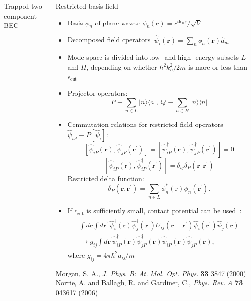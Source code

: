 \documentclass[final,hyperref={pdfpagelabels=false}]{beamer}
\begin{document}
\begin{frame}
\begin{columns}
{\begin{block}{Trapped two-component BEC}
\end{block}

\begin{block}{Restricted basis field}

\begin{itemize}
	\item Basis $\phi_{n}$ of plane waves: $\phi_{n}(\mathbf{r}) = e^{i \mathbf{k}_n \mathbf{r}} / \sqrt{V}$
	\item Decomposed field operators: $\hat{\psi}_i(\mathbf{r}) = \sum\limits_n \phi_{n}(\mathbf{r}) \hat{a}_{in}$
	\item Mode space is divided into low- and high- energy subsets $L$ and $H$,
		depending on whether $\hbar^2 k_n^2 / 2 m $ is more or less than $\epsilon_{\textrm{cut}}$~\cite{norrie}
	\item Projector operators:	
\[ P \equiv \sum\limits_{n \in L} \lvert n \rangle \langle n \rvert,\,
Q \equiv \sum\limits_{n \in H} \lvert n \rangle \langle n \rvert \]
	\item Commutation relations for restricted field operators $\hat{\psi}_{iP} \equiv P[\hat{\psi}_i]$:
\[
\left[ \hat{\psi}_{iP}(\mathbf{r}), \hat{\psi}_{jP}(\mathbf{r}^\prime) \right] =
\left[ \hat{\psi}_{iP}^\dagger(\mathbf{r}), \hat{\psi}_{jP}^\dagger(\mathbf{r}^\prime) \right] = 0
\]
\[
\left[ \hat{\psi}_{iP}(\mathbf{r}), \hat{\psi}_{iP}^\dagger(\mathbf{r}^\prime) \right] = \delta_{ij} \delta_{P}(\mathbf{r}, \mathbf{r}^\prime)
\]
	Restricted delta function:
\[
\delta_{P}(\mathbf{r}, \mathbf{r}^\prime) = \sum\limits_{n \in L} \phi_{n}^* (\mathbf{r}) \phi_{n} (\mathbf{r}^\prime).
\]
	\item If $\epsilon_{\textrm{cut}}$ is sufficiently small, contact potential can be used~\cite{morgan}:
\begin{align*}
\begin{split}
\int d\mathbf{r} \int d\mathbf{r}^\prime \,
	\hat{\psi}_i^\dagger (\mathbf{r}) \hat{\psi}_j^\dagger (\mathbf{r}^\prime)
	U_{ij}(\mathbf{r} - \mathbf{r}^\prime)
	\hat{\psi}_i(\mathbf{r}^\prime) \hat{\psi}_j(\mathbf{r}) \\
\rightarrow g_{ij} \int d\mathbf{r} \,
	\hat{\psi}_{iP}^\dagger (\mathbf{r}) \hat{\psi}_{jP}^\dagger (\mathbf{r})
	\hat{\psi}_{iP}(\mathbf{r}) \hat{\psi}_{jP}(\mathbf{r}),
\end{split}
\end{align*}
	where $g_{ij} = 4 \pi \hbar^2 a_{ij} / m$

\end{itemize}

\tiny{ \begin{thebibliography}{9}
	 Morgan, S. A., \textit{J. Phys. B: At. Mol. Opt. Phys.} \textbf{33} 3847 (2000)
	 Norrie, A. and Ballagh, R. and Gardiner, C., \textit{Phys. Rev. A} \textbf{73} 043617 (2006)
\end{thebibliography} }


\end{block}}
\end{columns}
\end{frame}
\end{document}
